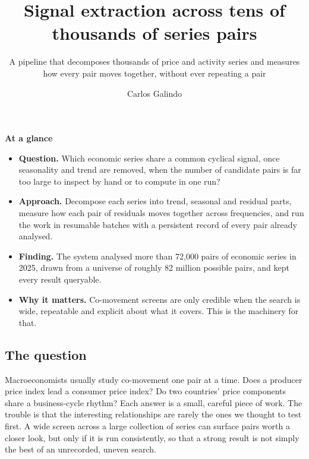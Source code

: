 \documentclass[
  british,
  a4paper,
]{article}
\title{Signal extraction across tens of thousands of series pairs}
\subtitle{A pipeline that decomposes thousands of price and activity
series and measures how every pair moves together, without ever
repeating a pair}
\author{Carlos Galindo}
\date{}
\providecommand{\tightlist}{%
  \setlength{\itemsep}{0pt}\setlength{\parskip}{0pt}}
\begin{document}
\maketitle


\begin{tcolorbox}[enhanced jigsaw, arc=.35mm, bottomrule=.15mm, breakable, colback=white, colframe=quarto-callout-note-color-frame, left=2mm, leftrule=.75mm, opacityback=0, rightrule=.15mm, toprule=.15mm]

\vspace{-3mm}\textbf{At a glance}\vspace{3mm}

\begin{itemize}
\tightlist
\item
  \textbf{Question.} Which economic series share a common cyclical
  signal, once seasonality and trend are removed, when the number of
  candidate pairs is far too large to inspect by hand or to compute in
  one run?
\item
  \textbf{Approach.} Decompose each series into trend, seasonal and
  residual parts, measure how each pair of residuals moves together
  across frequencies, and run the work in resumable batches with a
  persistent record of every pair already analysed.
\item
  \textbf{Finding.} The system analysed more than 72,000 pairs of
  economic series in 2025, drawn from a universe of roughly 82 million
  possible pairs, and kept every result queryable.
\item
  \textbf{Why it matters.} Co-movement screens are only credible when
  the search is wide, repeatable and explicit about what it covers. This
  is the machinery for that.
\end{itemize}

\end{tcolorbox}

\subsection{The question}\label{the-question}

Macroeconomists usually study co-movement one pair at a time. Does a
producer price index lead a consumer price index? Do two countries'
price components share a business-cycle rhythm? Each answer is a small,
careful piece of work. The trouble is that the interesting relationships
are rarely the ones we thought to test first. A wide screen across a
large collection of series can surface pairs worth a closer look, but
only if it is run consistently, so that a strong result is not simply
the best of an unrecorded, uneven search.
\end{document}
